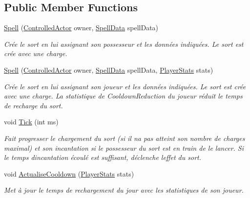 \subsection*{Public Member Functions}
\begin{DoxyCompactItemize}
\item 
\hyperlink{class_tentacle_slicers_1_1spells_1_1_spell_a25863b695362026f53baaadbc5654507}{Spell} (\hyperlink{class_tentacle_slicers_1_1actors_1_1_controlled_actor}{Controlled\+Actor} owner, \hyperlink{class_tentacle_slicers_1_1spells_1_1_spell_data}{Spell\+Data} spell\+Data)
\begin{DoxyCompactList}\small\item\em Crée le sort en lui assignant son possesseur et les données indiquées. Le sort est crée avec une charge. \end{DoxyCompactList}\item 
\hyperlink{class_tentacle_slicers_1_1spells_1_1_spell_a3ab5f2807146348c84b264ab16d664e0}{Spell} (\hyperlink{class_tentacle_slicers_1_1actors_1_1_controlled_actor}{Controlled\+Actor} owner, \hyperlink{class_tentacle_slicers_1_1spells_1_1_spell_data}{Spell\+Data} spell\+Data, \hyperlink{class_tentacle_slicers_1_1actors_1_1_player_stats}{Player\+Stats} stats)
\begin{DoxyCompactList}\small\item\em Crée le sort en lui assignant son joueur et les données indiquées. Le sort est crée avec une charge. La statistique de Cooldown\+Reduction du joueur réduit le temps de recharge du sort. \end{DoxyCompactList}\item 
void \hyperlink{class_tentacle_slicers_1_1spells_1_1_spell_a5cf10338202ec828cc462808cfa76ee7}{Tick} (int ms)
\begin{DoxyCompactList}\small\item\em Fait progresser le chargement du sort (si il n\textquotesingle{}a pas atteint son nombre de charges maximal) et son incantation si le possesseur du sort est en train de le lancer. Si le temps d\textquotesingle{}incantation écoulé est suffisant, déclenche l\textquotesingle{}effet du sort. \end{DoxyCompactList}\item 
void \hyperlink{class_tentacle_slicers_1_1spells_1_1_spell_a5dc46c946187e81a5c555bb931d6692d}{Actualise\+Cooldown} (\hyperlink{class_tentacle_slicers_1_1actors_1_1_player_stats}{Player\+Stats} stats)
\begin{DoxyCompactList}\small\item\em Met à jour le temps de rechargement du jour avec les statistiques de son joueur. \end{DoxyCompactList}\item 

\end{DoxyCompactItemize}
